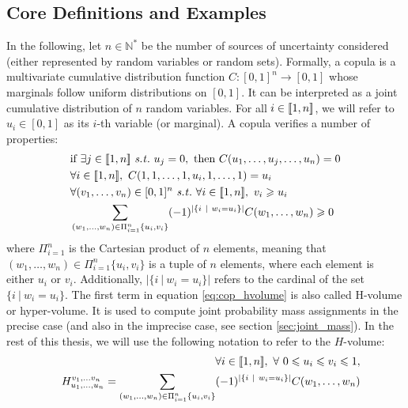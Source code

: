\subsection{Core Definitions and Examples}\label{sec:copula_def}
In the following, let $n\in\mathbb{N}^*$ be the number of sources of uncertainty considered (either represented by random variables or random sets). Formally, a copula is a multivariate cumulative distribution function $C:[0,1]^{n}\rightarrow [0,1]$ whose marginals follow uniform distributions on $[0,1]$. It can be interpreted as a joint cumulative distribution of $n$ random variables. For all $i\in{[\![} 1,n{]\!]} $, we will refer to $u_i\in[0,1]$ as its $i$-th variable (or marginal). A copula verifies a number of properties:
\begin{align}
    &\text{if }\exists j\in\opi 1,n\cli  \text{ \st }~u_j=0, \text{ then }C(u_1,\dots,u_j,\dots,u_n)=0\label{eq:zero_copula}\\
    &\forall i\in\opi 1,n\cli ,~C(1,1,\dots,1,u_i,1,\dots,1)=u_i\label{eq:copula_ones}\\
    &\forall (v_1,\dots,v_n)\in[0,1]^n \text{ \st }~\forall i\in\opi 1,n\cli ,~v_i\geqslant u_i\nonumber\\
    &\sum_{(w_1, \dots, w_n)\in\Pi_{i=1}^n\{u_i, v_i\}}(-1)^{|\{i~|~w_i=u_i\}|}C(w_1, \dots, w_n)\geqslant 0\label{eq:cop_hvolume}
\end{align}
where $\Pi_{i=1}^n$ is the Cartesian product of $n$ elements, meaning that $(w_1, \dots, w_n)\in\Pi_{i=1}^n\{u_i, v_i\}$ is a tuple of $n$ elements, where each element is either $u_i$ or $v_i$. Additionally, $|\{i~|~w_i=u_i\}|$ refers to the cardinal of the set $\{i~|~w_i=u_i\}$. The first term in equation \eqref{eq:cop_hvolume} is also called H-volume or hyper-volume. It is used to compute joint probability mass assignments in the precise case (and also in the imprecise case, see section \ref{sec:joint_mass}). In the rest of this thesis, we will use the following notation to refer to the $H$-volume:
\begin{eqnarray}\label{eq:hvolume}
    &&\forall i\in{[\![} 1,n{]\!]} ,~\forall~0\leqslant u_i \leqslant v_i \leqslant 1,\nonumber\\
    &&H^{v_1,\dots v_n}_{u_1,\dots,u_n}=\sum_{(w_1, \dots, w_n)\in\Pi_{i=1}^n\{u_i, v_i\}}(-1)^{|\{i~|~w_i=u_i\}|}C(w_1, \dots, w_n)
\end{eqnarray}

